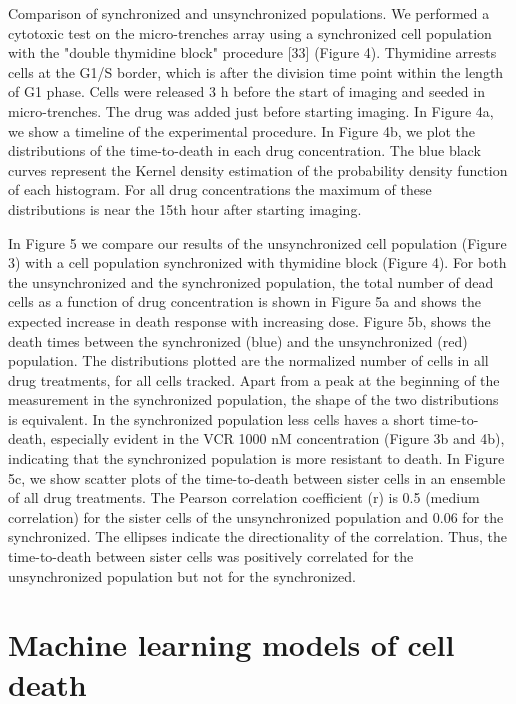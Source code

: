 \documentclass[pdftex,12pt,a4paper]{report}
\begin{document}
Comparison of synchronized and unsynchronized populations. We performed a cytotoxic test on the micro-trenches array using a synchronized cell population with the "double thymidine block" procedure [33] (Figure 4). Thymidine arrests cells at the G1/S border, which is after the division time point within the length of G1 phase. Cells were released 3 h before the start of imaging and seeded in micro-trenches. The drug was added just before starting imaging. In Figure 4a, we show a timeline of the experimental procedure. In Figure 4b, we plot the distributions of the time-to-death in each drug concentration. The blue black curves represent the Kernel density estimation of the probability density function of each histogram. For all drug concentrations the maximum of these distributions is near the 15th hour after starting imaging.

In Figure 5 we compare our results of the unsynchronized cell population (Figure 3) with a cell population synchronized with thymidine block (Figure 4). For both the unsynchronized and the synchronized population, the total number of dead cells as a function of drug concentration is shown in Figure 5a and shows the expected increase in death response with increasing dose. Figure 5b, shows the death times between the synchronized (blue) and the unsynchronized (red) population. The distributions plotted are the normalized number of cells in all drug treatments, for all cells tracked. Apart from a peak at the beginning of the measurement in the synchronized population, the shape of the two distributions is equivalent. In the synchronized population less cells haves a short time-to-death, especially evident in the VCR 1000 nM concentration (Figure 3b and 4b), indicating that the synchronized population is more resistant to death. In Figure 5c, we show scatter plots of the time-to-death between sister cells in an ensemble of all drug treatments. The Pearson correlation coefficient (r) is 0.5 (medium correlation) for the sister cells of the unsynchronized population and 0.06 for the synchronized. The ellipses indicate the directionality of the correlation. Thus, the time-to-death between sister cells was positively correlated for the unsynchronized population but not for the synchronized.


\section{Machine learning models of cell death}
\label{section:ml_results}
\end{document}
